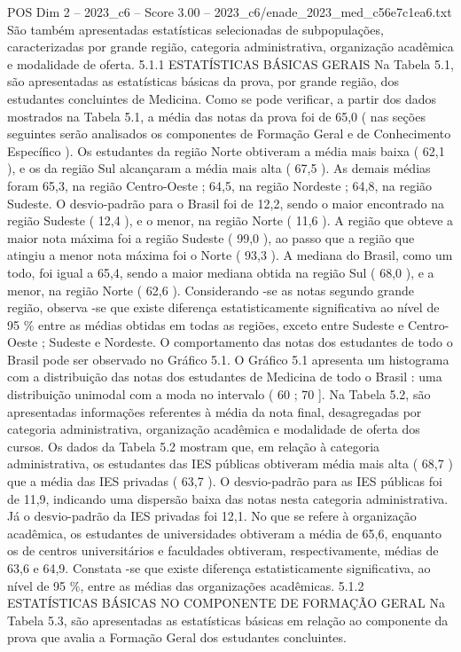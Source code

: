 \begin{textsample}{POS Dim 2 – 2023\_c6 – Score 3.00 – 2023\_c6/enade\_2023\_med\_c56e7c1ea6.txt}
São também apresentadas estatísticas selecionadas de subpopulações, caracterizadas por grande região, categoria administrativa, organização acadêmica e modalidade de oferta. 5.1.1 ESTATÍSTICAS BÁSICAS GERAIS Na Tabela 5.1, são apresentadas as estatísticas básicas da prova, por grande região, dos estudantes concluintes de Medicina.
Como se pode verificar, a partir dos dados mostrados na Tabela 5.1, a média das notas da prova foi de 65,0 ( nas seções seguintes serão analisados os componentes de Formação Geral e de Conhecimento Específico ).
Os estudantes da região Norte obtiveram a média mais baixa ( 62,1 ), e os da região Sul alcançaram a média mais alta ( 67,5 ).
As demais médias foram 65,3, na região Centro-Oeste ; 64,5, na região Nordeste ; 64,8, na região Sudeste.
O desvio-padrão para o Brasil foi de 12,2, sendo o maior encontrado na região Sudeste ( 12,4 ), e o menor, na região Norte ( 11,6 ).
A região que obteve a maior nota máxima foi a região Sudeste ( 99,0 ), ao passo que a região que atingiu a menor nota máxima foi o Norte ( 93,3 ).
A mediana do Brasil, como um todo, foi igual a 65,4, sendo a maior mediana obtida na região Sul ( 68,0 ), e a menor, na região Norte ( 62,6 ).
Considerando -se as notas segundo grande região, observa -se que existe diferença estatisticamente significativa ao nível de 95 \% entre as médias obtidas em todas as regiões, exceto entre Sudeste e Centro-Oeste ; Sudeste e Nordeste.
O comportamento das notas dos estudantes de todo o Brasil pode ser observado no Gráfico 5.1.
O Gráfico 5.1 apresenta um histograma com a distribuição das notas dos estudantes de Medicina de todo o Brasil : uma distribuição unimodal com a moda no intervalo ( 60 ; 70 ].
Na Tabela 5.2, são apresentadas informações referentes à média da nota final, desagregadas por categoria administrativa, organização acadêmica e modalidade de oferta dos cursos.
Os dados da Tabela 5.2 mostram que, em relação à categoria administrativa, os estudantes das IES públicas obtiveram média mais alta ( 68,7 ) que a média das IES privadas ( 63,7 ).
O desvio-padrão para as IES públicas foi de 11,9, indicando uma dispersão baixa das notas nesta categoria administrativa.
Já o desvio-padrão da IES privadas foi 12,1.
No que se refere à organização acadêmica, os estudantes de universidades obtiveram a média de 65,6, enquanto os de centros universitários e faculdades obtiveram, respectivamente, médias de 63,6 e 64,9.
Constata -se que existe diferença estatisticamente significativa, ao nível de 95 \%, entre as médias das organizações acadêmicas. 5.1.2 ESTATÍSTICAS BÁSICAS NO COMPONENTE DE FORMAÇÃO GERAL Na Tabela 5.3, são apresentadas as estatísticas básicas em relação ao componente da prova que avalia a Formação Geral dos estudantes concluintes.

\end{textsample}
